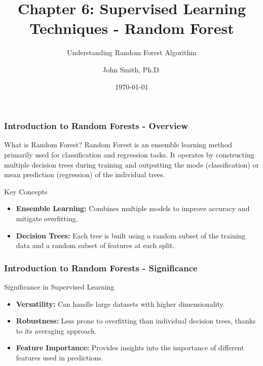 \documentclass[aspectratio=169]{beamer}
\title[Academic Presentation on Random Forests]{Chapter 6: Supervised Learning Techniques - Random Forest}
\subtitle{Understanding Random Forest Algorithm}
\author[J. Smith]{John Smith, Ph.D.}
\institute[University Name]{
  Department of Computer Science\\
  University Name\\
  \vspace{0.3cm}
  Email: email@university.edu\\
  Website: www.university.edu
}
\date{\today}
\begin{document}
\frame{\titlepage}

\begin{frame}[fragile]
    \frametitle{Introduction to Random Forests - Overview}
    \begin{block}{What is Random Forest?}
        Random Forest is an ensemble learning method primarily used for classification and regression tasks. It operates by constructing multiple decision trees during training and outputting the mode (classification) or mean prediction (regression) of the individual trees.
    \end{block}
    
    \begin{block}{Key Concepts}
        \begin{itemize}
            \item \textbf{Ensemble Learning:} Combines multiple models to improve accuracy and mitigate overfitting.
            \item \textbf{Decision Trees:} Each tree is built using a random subset of the training data and a random subset of features at each split.
        \end{itemize}
    \end{block}
\end{frame}

\begin{frame}[fragile]
    \frametitle{Introduction to Random Forests - Significance}
    \begin{block}{Significance in Supervised Learning}
        \begin{itemize}
            \item \textbf{Versatility:} Can handle large datasets with higher dimensionality.
            \item \textbf{Robustness:} Less prone to overfitting than individual decision trees, thanks to its averaging approach.
            \item \textbf{Feature Importance:} Provides insights into the importance of different features used in predictions.
        \end{itemize}
    \end{block}
\end{frame}
\end{document}
